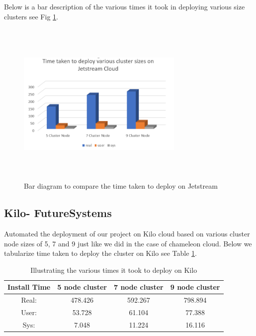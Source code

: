 \documentclass[9pt,twocolumn,twoside]{../../styles/osajnl}
\begin{document}
Below is a bar description of the various times it took in deploying various size clusters see Fig \ref{i:barjet}.

\begin{figure}[!htb]
  \includegraphics[width=8cm,height=8cm,keepaspectratio,width=\linewidth]{images/bar-2.png}
  \caption{Bar diagram to compare the time taken to deploy on Jetstream }
  \label{i:barjet}
\end{figure}


\subsection{Kilo- FutureSystems}

Automated the deployment of our project  on Kilo cloud based on various cluster node sizes of 5, 7 and 9 just like we did in the case of chameleon cloud. Below we tabularize time taken to deploy the cluster on Kilo see Table \ref{T:timekilo}.

\begin{table}[!htb]
\centering
\caption{Illustrating the various times it took to deploy on Kilo}\label{T:timekilo}
\begin{center}
 \begin{tabular}{|c|| c c c|} 
 \hline
 Install Time &  5 node cluster & 7 node cluster & 9 node cluster\\ [0.5ex]
 \hline\hline
 Real: & 478.426 & 592.267 & 798.894 \\ 
 \hline
 User: & 53.728 & 61.104 & 77.388 \\
 \hline
 Sys: & 7.048 & 11.224 & 16.116 \\
 \hline
\end{tabular}
\end{center}
\end{table}
\end{document}
